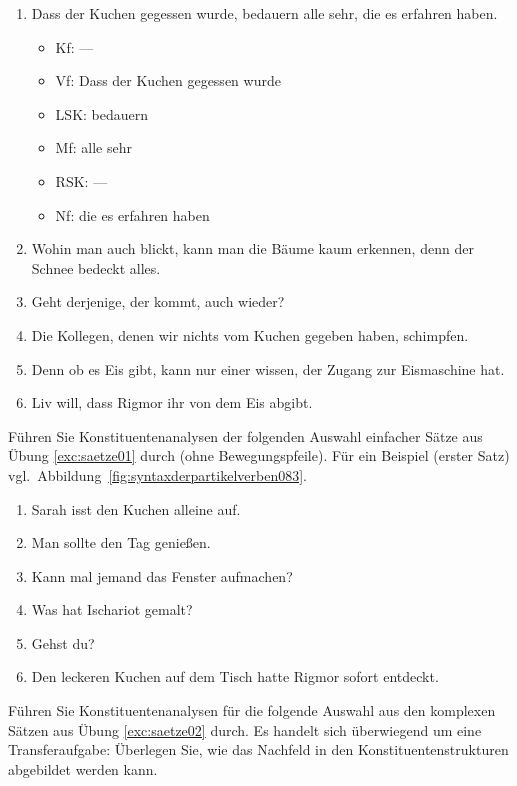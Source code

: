 \begin{enumerate}
  \item Dass der Kuchen gegessen wurde, bedauern alle sehr, die es erfahren haben.
    \begin{itemize}
      \item Kf: ---
      \item Vf: Dass der Kuchen gegessen wurde
      \item LSK: bedauern
      \item Mf: alle sehr
      \item RSK: ---
      \item Nf: die es erfahren haben
    \end{itemize}
  \item Wohin man auch blickt, kann man die Bäume kaum erkennen, denn der Schnee bedeckt alles.
  \item Geht derjenige, der kommt, auch wieder?
  \item Die Kollegen, denen wir nichts vom Kuchen gegeben haben, schimpfen.
  \item Denn ob es Eis gibt, kann nur einer wissen, der Zugang zur Eismaschine hat.
  \item Liv will, dass Rigmor ihr von dem Eis abgibt.
\end{enumerate}

 \label{exc:saetze03} Führen Sie Konstituentenanalysen der folgenden Auswahl einfacher Sätze aus Übung \ref{exc:saetze01} durch (ohne Bewegungspfeile).
Für ein Beispiel (erster Satz) vgl.\ Abbildung~\ref{fig:syntaxderpartikelverben083}.

\begin{enumerate}
  \item{Sarah isst den Kuchen alleine auf.}
  \item{Man sollte den Tag genießen.}
  \item{Kann mal jemand das Fenster aufmachen?}
  \item{Was hat Ischariot gemalt?}
  \item{Gehst du?}
  \item{Den leckeren Kuchen auf dem Tisch hatte Rigmor sofort entdeckt.}
\end{enumerate}

 \label{exc:saetze04} Führen Sie Konstituentenanalysen für die folgende Auswahl aus den komplexen Sätzen aus Übung \ref{exc:saetze02} durch.
Es handelt sich überwiegend um eine Transferaufgabe:
Überlegen Sie, wie das Nachfeld in den Konstituentenstrukturen abgebildet werden kann.

